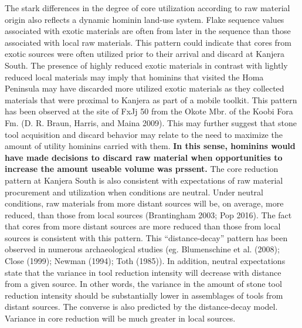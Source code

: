 \documentclass[]{elsarticle} %
\begin{document}
The stark differences in the degree of core utilization according to raw
material origin also reflects a dynamic hominin land-use system. Flake
sequence values associated with exotic materials are often from later in
the sequence than those associated with local raw materials. This
pattern could indicate that cores from exotic sources were often
utilized prior to their arrival and discard at Kanjera South. The
presence of highly reduced exotic materials in contrast with lightly
reduced local materials may imply that hominins that visited the Homa
Peninsula may have discarded more utilized exotic materials as they
collected materials that were proximal to Kanjera as part of a mobile
toolkit. This pattern has been observed at the site of FxJj 50 from the
Okote Mbr. of the Koobi Fora Fm. (D. R. Braun, Harris, and Maina 2009).
This may further suggest that stone tool acquisition and discard
behavior may relate to the need to maximize the amount of utility
hominins carried with them. \textbf{In this sense, hominins would have
made decisions to discard raw material when opportunities to increase
the amount useable volume was prssent.} The core reduction pattern at
Kanjera South is also consistent with expectations of raw material
procurement and utilization when conditions are neutral. Under neutral
conditions, raw materials from more distant sources will be, on average,
more reduced, than those from local sources (Brantingham 2003; Pop
2016). The fact that cores from more distant sources are more reduced
than those from local sources is consistent with this pattern. This
``distance-decay'' pattern has been observed in numerous archaeological
studies (eg. Blumenschine et al. (2008); Close (1999); Newman (1994);
Toth (1985)). In addition, neutral expectations state that the variance
in tool reduction intensity will decrease with distance from a given
source. In other words, the variance in the amount of stone tool
reduction intensity should be substantially lower in assemblages of
tools from distant sources. The converse is also predicted by the
distance-decay model. Variance in core reduction will be much greater in
local sources.
\end{document}
